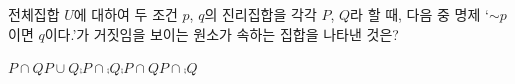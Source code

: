 전체집합 $U$에 대하여 두 조건 $p$, $q$의 진리집합을 각각 $P$, $Q$라 할 때, 다음 중 명제 `$\sim p$이면 $q$이다.'가 거짓임을 보이는 원소가 속하는 집합을 나타낸 것은?
\begin{choices32}{$P\cap Q$}{$P\cup Q$}{$\comp{P}\cap\comp{Q}$}{$\comp{P}\cap Q$}{$P\cap\comp{Q}$}\end{choices32}
